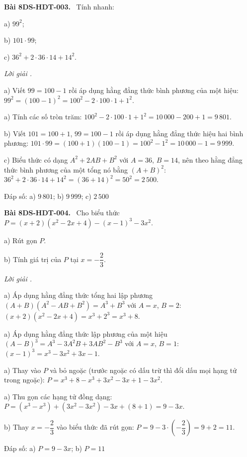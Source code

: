 \documentclass[12pt,a4paper]{article}
\newenvironment{problem}[1][]{\par\medskip\noindent\textbf{Bài #1.}\ }{\par}
\newenvironment{solution}[1][]{\par\noindent\textit{Lời giải #1.}\par}{\par}
\begin{document}
\begin{problem}[8DS-HDT-003]
Tính nhanh:

a) $99^2$;

b) $101 \cdot 99$;

c) $36^2 + 2 \cdot 36 \cdot 14 + 14^2$.

\begin{solution}
a) Viết $99 = 100 - 1$ rồi áp dụng hằng đẳng thức bình phương của một hiệu: $99^2 = (100 - 1)^2 = 100^2 - 2 \cdot 100 \cdot 1 + 1^2$.

a) Tính các số tròn trăm: $100^2 - 2 \cdot 100 \cdot 1 + 1^2 = 10\,000 - 200 + 1 = 9\,801$.

b) Viết $101 = 100 + 1$, $99 = 100 - 1$ rồi áp dụng hằng đẳng thức hiệu hai bình phương: $101 \cdot 99 = (100 + 1)(100 - 1) = 100^2 - 1^2 = 10\,000 - 1 = 9\,999$.

c) Biểu thức có dạng $A^2 + 2AB + B^2$ với $A = 36$, $B = 14$, nên theo hằng đẳng thức bình phương của một tổng nó bằng $(A + B)^2$: $36^2 + 2 \cdot 36 \cdot 14 + 14^2 = (36 + 14)^2 = 50^2 = 2\,500$.

Đáp số: a) $\boxed{9\,801}$; b) $\boxed{9\,999}$; c) $\boxed{2\,500}$
\end{solution}
\end{problem}

\begin{problem}[8DS-HDT-004]
Cho biểu thức $P = (x + 2)(x^2 - 2x + 4) - (x - 1)^3 - 3x^2$.

a) Rút gọn $P$.

b) Tính giá trị của $P$ tại $x = -\dfrac{2}{3}$.

\begin{solution}
a) Áp dụng hằng đẳng thức tổng hai lập phương $(A + B)(A^2 - AB + B^2) = A^3 + B^3$ với $A = x$, $B = 2$: $(x + 2)(x^2 - 2x + 4) = x^3 + 2^3 = x^3 + 8$.

a) Áp dụng hằng đẳng thức lập phương của một hiệu $(A - B)^3 = A^3 - 3A^2B + 3AB^2 - B^3$ với $A = x$, $B = 1$: $(x - 1)^3 = x^3 - 3x^2 + 3x - 1$.

a) Thay vào $P$ và bỏ ngoặc (trước ngoặc có dấu trừ thì đổi dấu mọi hạng tử trong ngoặc): $P = x^3 + 8 - x^3 + 3x^2 - 3x + 1 - 3x^2$.

a) Thu gọn các hạng tử đồng dạng: $P = (x^3 - x^3) + (3x^2 - 3x^2) - 3x + (8 + 1) = 9 - 3x$.

b) Thay $x = -\dfrac{2}{3}$ vào biểu thức đã rút gọn: $P = 9 - 3 \cdot \left(-\dfrac{2}{3}\right) = 9 + 2 = 11$.

Đáp số: a) $\boxed{P = 9 - 3x}$; b) $\boxed{P = 11}$
\end{solution}
\end{problem}
\end{document}
